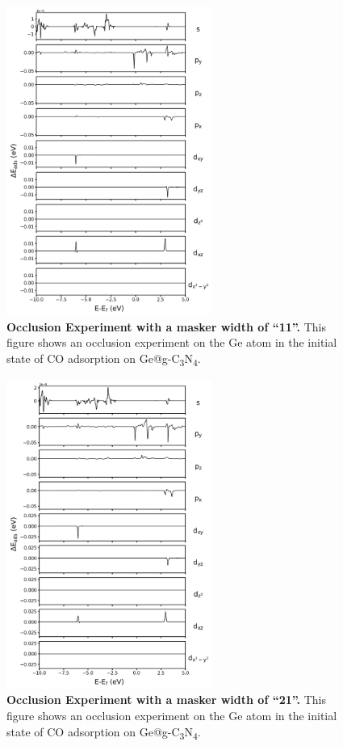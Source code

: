 \begin{figure}[htbp]
  \centering
  \includegraphics[width=0.6\textwidth]{supp_fig25_occl_wid11.png}
  \caption{\textbf{Occlusion Experiment with a masker width of ``11''.}
  This figure shows an occlusion experiment on the Ge atom in
  the initial state of CO adsorption on Ge@g-C\textsubscript{3}N\textsubscript{4}.}
  \label{supp_fig25:occl_wid11}
\end{figure}

\begin{figure}[htbp]
  \centering
  \includegraphics[width=0.6\textwidth]{supp_fig26_occl_wid21.png}
  \caption{\textbf{Occlusion Experiment with a masker width of ``21''.}
  This figure shows an occlusion experiment on the Ge atom in
  the initial state of CO adsorption on Ge@g-C\textsubscript{3}N\textsubscript{4}.}
  \label{supp_fig26:occl_wid21}
\end{figure}

